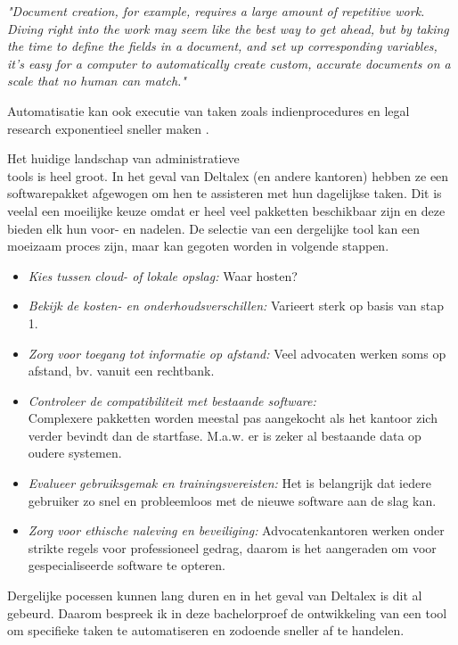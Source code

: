 \begin{displayquote}
	\textit{"Document creation, for example, requires a large amount of repetitive work. Diving right into the work may seem like the best way to get ahead, but by taking the time to define the fields in a document, and set up corresponding variables, it’s easy for a computer to automatically create custom, accurate documents on a scale that no human can match."}
	\autocite{ThomsonReuters2023}
\end{displayquote}


Automatisatie kan ook executie van taken zoals indienprocedures en legal research exponentieel sneller maken \autocite{Aston2023}.

Het huidige landschap van administratieve\\ tools is heel groot. 
In het geval van Deltalex (en andere kantoren) hebben ze een softwarepakket afgewogen om hen te assisteren met hun dagelijkse taken. 
Dit is veelal een moeilijke keuze omdat er heel veel pakketten beschikbaar zijn en deze bieden elk hun voor- en nadelen. 
De selectie van een dergelijke tool kan een moeizaam proces zijn, maar kan gegoten worden in volgende stappen.

\begin{itemize}
	\item \emph{Kies tussen cloud- of lokale opslag:} Waar hosten?
	\item \emph{Bekijk de kosten- en onderhoudsverschillen:} Varieert sterk op basis van stap 1.
	\item \emph{Zorg voor toegang tot informatie op afstand:} Veel advocaten werken soms op afstand, bv. vanuit een rechtbank.
	\item \emph{Controleer de compatibiliteit met bestaande software:}\\ Complexere pakketten worden meestal pas aangekocht als het kantoor zich verder bevindt dan de startfase. M.a.w. er is zeker al bestaande data op oudere systemen.
	\item \emph{Evalueer gebruiksgemak en trainingsvereisten:} Het is belangrijk dat iedere gebruiker zo snel en probleemloos met de nieuwe software aan de slag kan.
	\item \emph{Zorg voor ethische naleving en beveiliging:} Advocatenkantoren werken onder strikte regels voor professioneel gedrag, daarom is het aangeraden om voor gespecialiseerde software te opteren. \autocite{Clio2023}
\end{itemize}

Dergelijke pocessen kunnen lang duren en in het geval van Deltalex is dit al gebeurd. 
Daarom bespreek ik in deze bachelorproef de ontwikkeling van een tool om specifieke taken te automatiseren en zodoende 
sneller af te handelen.


